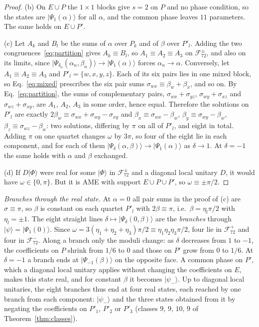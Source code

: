 \documentclass[aps,pra,reprint,superscriptaddress,amsmath,amssymb,longbibliography]{revtex4-2}
\newcommand{\ket}[1]{\lvert #1\rangle}
\theoremstyle{plain}
\begin{document}
\begin{proof}
(b) On $E\cup P$ the $1\times1$ blocks give $s=2$ on $P$ and no phase condition, so the states are
$\ket{\Psi_1(\alpha)}$ for all $\alpha$, and the common phase leaves $11$ parameters.  The same holds on $E\cup P'$.

(c) Let $A_k$ and $B_l$ be the sums of $\alpha$ over $P_k$ and of $\beta$ over $P'_l$.  Adding the two
congruences~\eqref{eq:partition} gives $A_k\equiv B_l$, so $A_1\equiv A_2\equiv A_3$ on $\mathcal F_{72}^\pm$, and also
on its limits, since $\ket{\Psi_{\delta_n}(\alpha_n,\beta_n)}\to\ket{\Psi_1(\alpha)}$ forces $\alpha_n\to\alpha$.
Conversely, let $A_1\equiv A_2\equiv A_3$ and $P'_l=\{w,x,y,z\}$.  Each of its six pairs lies in one mixed block, so
Eq.~\eqref{eq:mixed} prescribes the six pair sums $\sigma_{wx}\equiv\beta_w+\beta_x$, and so on.  By
Eq.~\eqref{eq:partition}, the sums of complementary pairs, $\sigma_{wx}+\sigma_{yz}$, $\sigma_{wy}+\sigma_{xz}$ and $\sigma_{wz}+\sigma_{xy}$, are
$A_1$, $A_2$, $A_3$ in some order, hence equal.  Therefore the solutions on $P'_l$ are exactly
$2\beta_w\equiv \sigma_{wx}+\sigma_{wy}-\sigma_{xy}$ and $\beta_x\equiv \sigma_{wx}-\beta_w$, $\beta_y\equiv \sigma_{wy}-\beta_w$,
$\beta_z\equiv \sigma_{wz}-\beta_w$: two solutions, differing by $\pi$ on all of $P'_l$, and eight in total.  Adding $\pi$ on
one quartet changes $\omega$ by $3\pi$, so four of the eight lie in each component, and for each of them
$\ket{\Psi_\delta(\alpha,\beta)}\to\ket{\Psi_1(\alpha)}$ as $\delta\to1$.  At $\delta=-1$ the same holds with $\alpha$
and $\beta$ exchanged.

(d) If $D\ket\Phi$ were real for some $\ket\Phi$ in $\mathcal F_{72}^\pm$ and a diagonal local unitary $D$, it would
have $\omega\in\{0,\pi\}$.  But it is AME with support $E\cup P\cup P'$, so $\omega\equiv\pm\pi/2$.
\end{proof}

\emph{Branches through the real state.}  At $\alpha=0$ all pair sums in the proof of (c) are $\sigma\equiv\pi$, so $\beta$
is constant on each quartet $P'_l$ with $2\beta\equiv\pi$, i.e.\ $\beta=\eta_l\pi/2$ with $\eta_l=\pm1$.  The eight
straight lines $\delta\mapsto\ket{\Psi_\delta(0,\beta)}$ are the \emph{branches} through $\ket\psi=\ket{\Psi_1(0)}$.
Since $\omega=3(\eta_1+\eta_2+\eta_3)\pi/2\equiv\eta_1\eta_2\eta_3\pi/2$, four lie in $\mathcal F_{72}^+$ and four in
$\mathcal F_{72}^-$.  Along a branch only the moduli change: as $\delta$ decreases from $1$ to $-1$, the coefficients on
$P$ shrink from $1/6$ to $0$ and those on $P'$ grow from $0$ to $1/6$.  At $\delta=-1$ a branch ends at
$\ket{\Psi_{-1}(\beta)}$ on the opposite face.  A common phase on $P'$, which a diagonal local unitary applies without
changing the coefficients on $E$, makes this state real, and for constant $\beta$ it becomes $\ket{\psi_-}$.  Up to diagonal
local unitaries, the eight branches thus end at four real states, each reached by one branch from each component:
$\ket{\psi_-}$ and the three states obtained from it by negating the coefficients on $P'_1$, $P'_2$ or $P'_3$ (classes
$9$, $9$, $10$, $9$ of Theorem~\ref{thm:classes}).
\end{document}
